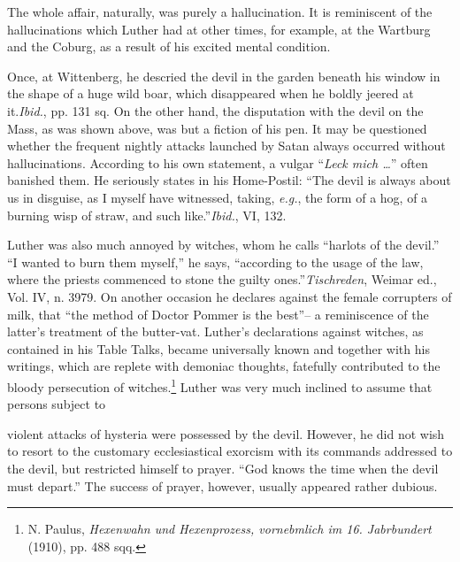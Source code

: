 The whole affair, naturally, was purely a hallucination. It is
reminiscent of the hallucinations which Luther had at other times, for
example, at the Wartburg and the Coburg, as a result of his excited
mental condition.

Once, at Wittenberg, he descried the devil in the garden beneath
his window in the shape of a huge wild boar, which disappeared when
he boldly jeered at it.\textit{Ibid.}, pp. 131 sq.
 On the other hand, the disputation with the
devil on the Mass, as was shown above, was but a fiction of his pen.
It may be questioned whether the frequent nightly attacks launched
by Satan always occurred without hallucinations. According to his
own statement, a vulgar “\textit{Leck mich \dots}” often banished them. He
seriously states in his Home-Postil: “The devil is always about us in
disguise, as I myself have witnessed, taking, \textit{e.g.}, the form of a hog, of
a burning wisp of straw, and such like.”\textit{Ibid.}, VI, 132.


Luther was also much annoyed by witches, whom he calls “harlots of the
devil.” “I wanted to burn them myself,” he says, “according to the usage
of the law, where the priests commenced to stone the
guilty ones.”\textit{Tischreden}, Weimar ed., Vol. IV, n. 3979.
 On another occasion he declares against the female
corrupters of milk, that “the method of Doctor Pommer is the best”--
a reminiscence of the latter’s treatment of the butter-vat. Luther’s
declarations against witches, as contained in his Table Talks, became
universally known and together with his writings, which are replete
with demoniac thoughts, fatefully contributed to the bloody persecution
of witches.\footnote
{N. Paulus, \textit{Hexenwahn und Hexenprozess, vornebmlich im 16. Jabrbundert} (1910),
pp. 488 sqq.}
Luther was very much inclined to assume that persons subject to

violent attacks of hysteria were possessed by the devil. However, he
did not wish to resort to the customary ecclesiastical exorcism with
its commands addressed to the devil, but restricted himself to prayer.
“God knows the time when the devil must depart.” The success of
prayer, however, usually appeared rather dubious.

